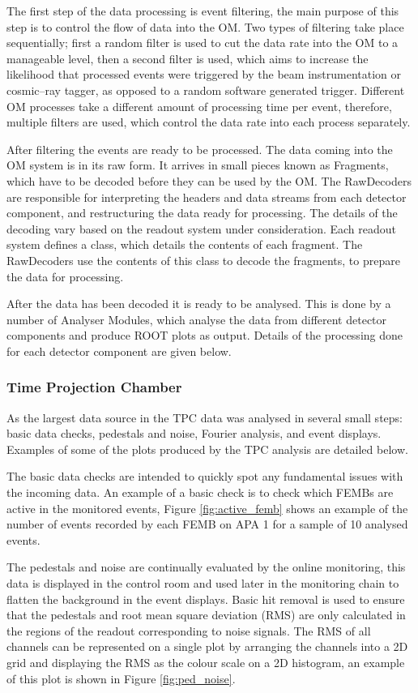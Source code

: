The first step of the data processing is event filtering, the main purpose of
this step is to control the flow of data into the OM. Two types of filtering
take place sequentially; first a random filter is used to cut the data rate into
the OM to a manageable level, then a second filter is used, which aims to 
increase the likelihood that processed events were triggered by the beam 
instrumentation or cosmic--ray tagger, as opposed to a random software generated
trigger. Different OM processes take a different amount of processing time per 
event, therefore, multiple filters are used, which control the data rate into 
each process separately.

After filtering the events are ready to be processed. The data coming into the
OM system is in its raw form. It arrives in small pieces known as Fragments,
which have to be decoded before they can be used by the OM. The RawDecoders 
are responsible for interpreting the headers and data streams from each 
detector component, and restructuring the data ready for processing. The 
details of the decoding vary based on the readout system under consideration. 
Each readout system defines a class, which details the contents of each
fragment. The RawDecoders use the contents of this class to decode the
fragments, to prepare the data for processing.

After the data has been decoded it is ready to be analysed. This is done by a
number of Analyser Modules, which analyse the data from different detector
components and produce ROOT\cite{ANTCHEVA20092499} plots as output. Details 
of the processing done for each detector component are given below.

\subsubsection*{Time Projection Chamber}
As the largest data source in \protodune{} the TPC data was analysed in several
small steps: basic data checks, pedestals and noise, Fourier analysis, and event
displays. Examples of some of the plots produced by the TPC analysis are
detailed below.

The basic data checks are intended to quickly spot any fundamental issues with
the incoming data. An example of a basic check is to check which FEMBs are
active in the monitored events, Figure \ref{fig:active_femb} shows an example of
the number of events recorded by each FEMB on APA 1 for a sample of 10 analysed
events.

The pedestals and noise are continually evaluated by the online monitoring, this
data is displayed in the control room and used later in the monitoring chain to
flatten the background in the event displays. Basic hit removal is used to 
ensure that the pedestals and root mean square deviation (RMS) are only 
calculated in the regions of the readout corresponding to noise signals. The 
RMS of all channels can be represented on a single plot by arranging the 
channels into a 2D grid and displaying the RMS as the colour scale on a 2D 
histogram, an example of this plot is shown in Figure \ref{fig:ped_noise}.

